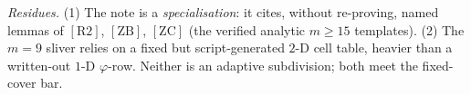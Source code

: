 \documentclass[11pt]{amsart}
\newcommand{\RII}{[\textrm{R2}]}
\newcommand{\ZB}{[\textrm{ZB}]}
\newcommand{\ZC}{[\textrm{ZC}]}
\begin{document}
\emph{Residues.}  (1) The note is a \emph{specialisation}: it cites, without
re-proving, named lemmas of $\RII$, $\ZB$, $\ZC$ (the verified analytic
$m\ge15$ templates).  (2) The $m=9$ sliver relies on a fixed but
script-generated $2$-D cell table, heavier than a written-out $1$-D
$\varphi$-row.  Neither is an adaptive subdivision; both meet the fixed-cover
bar.
\end{document}
